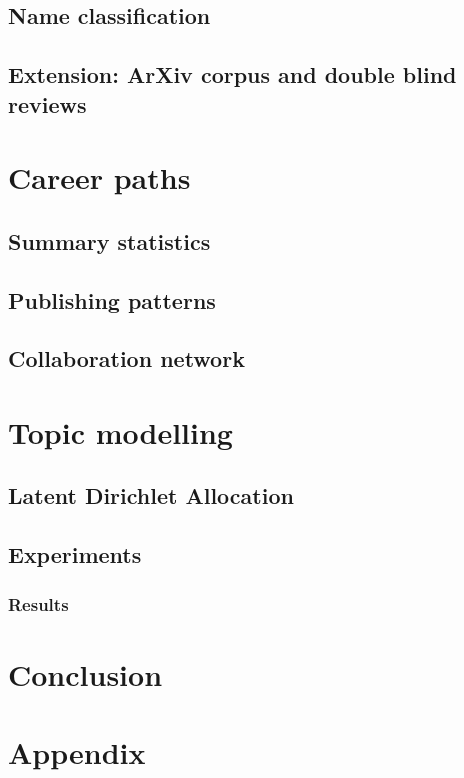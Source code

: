 \documentclass[bsc,frontabs,twoside,singlespacing,parskip,deptreport]{infthesis}     %
\begin{document}
\section{Name classification}
\section{Extension: ArXiv corpus and double blind reviews}

\chapter{Career paths}
\section{Summary statistics}
\section{Publishing patterns}
\section{Collaboration network}

\chapter{Topic modelling}
\section{Latent Dirichlet Allocation}
\section{Experiments}
\subsection{Results}

\chapter{Conclusion}




\chapter{Appendix}
\end{document}
